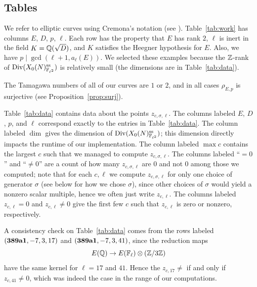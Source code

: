\documentclass{article} \usepackage[active]{srcltx}
\DeclareMathOperator{\supersingular}{ss}
\renewcommand{\ss}{\supersingular}
\begin{document}
\subsection{Tables}
\begin{table}[H]
\begin{center}
  \caption{Rank 2 curves, discriminants, and primes for which we
    computed $z_{c,\sigma,\ell}$.\label{tab:work}}\vspace{1ex}

\end{center}
\end{table}

We refer to elliptic curves using Cremona's notation (see
\cite{cremona:onlinetables}).  Table~\ref{tab:work} has columns $E$,
$D$, $p$, $\ell$.  Each row has the property that $E$ has rank $2$,
$\ell$ is inert in the field $K=\mathbb{Q}(\sqrt{D})$, and $K$ satisfies the
Heegner hypothesis for $E$.  Also, we have $p\mid \gcd(\ell+1,
a_{\ell}(E))$.  We selected these examples because the $\mathbb{Z}$-rank of
$\Div(X_0(N)_{\F_{\ell^2}}^{\ss})$ is relatively small
(the dimensions are in Table~\ref{tab:data}).

The Tamagawa numbers of all of our curves are $1$ or $2$, and in all cases
$\rho_{E,p}$ is surjective (see Proposition~\ref{prop:surj}).

Table~\ref{tab:data} contains data about the points
$z_{c,\sigma,\ell}$.  The columns labeled $E$, $D$, $p$, and $\ell$
correspond exactly to the entries in Table~\ref{tab:data}. The column
labeled $\dim$ gives the dimension of
$\Div(X_0(N)_{\F_{\ell^2}}^{\ss})$; this dimension directly impacts
the runtime of our implementation.  The column labeled $\max{}c$
contains the largest $c$ such that we managed to compute
$z_{c,\sigma,\ell}$.  The columns labeled ``$=0$'' and ``$\neq 0$''
are a count of how many $z_{c,\sigma,\ell}$ are $0$ and not $0$ among
those we computed; note that for each $c,\ell$ we compute
$z_{c,\sigma,\ell}$ for only one choice of generator $\sigma$ (see
below for how we chose $\sigma$), since other choices of $\sigma$
would yield a nonzero scalar multiple, hence we often just write
$z_{c,\ell}$.  The columns labeled $z_{c,\ell}=0$ and $z_{c,\ell}\neq
0$ give the first few $c$ such that $z_{c,\ell}$ is zero or nonzero,
respectively.

A consistency check on Table~\ref{tab:data} comes from the rows
labeled $({\bf 389a1},-7,3,17)$ and $({\bf 389a1},-7,3,41)$, since the
reduction maps
$$E(\mathbb{Q}) \to E(\mathbb{F}_{\ell})\otimes(\mathbb{Z}/3\mathbb{Z})$$
have the same kernel for $\ell=17$ and $41$.  Hence the $z_{c,17}\neq$
if and only if $z_{c,41}\neq 0$, which was indeed the case in the
range of our computations.
\end{document}
